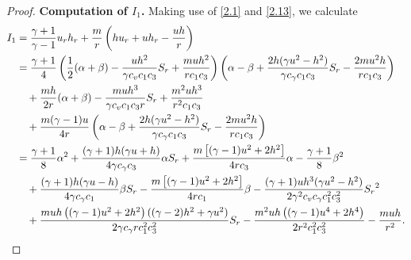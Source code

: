 \documentclass[10pt,a4paper]{amsart}
\begin{document}
\begin{proof}
\noindent\textbf{Computation of $I_1$.}
Making use of \eqref{2.1} and \eqref{2.13}, we calculate
\begin{align}
I_1 &=\frac{\gamma+1}{\gamma-1}u_rh_r+\frac{m}{r}\left(hu_r+uh_r-\frac{uh}{r}\right)\nonumber\\
&=\frac{\gamma+1}{4}\left( \frac12(\alpha+\beta)-\frac{uh^2}{\gamma c_v c_1c_3}S_r +\frac{muh^2}{r c_1 c_3} \right) \left( \alpha-\beta+\frac{2h(\gamma u^2-h^2)}{\gamma c_\gamma c_1c_3}S_r-\frac{2m u^2h}{r c_1 c_3} \right) \nonumber\\
&\quad + \frac{mh}{2r}(\alpha+\beta)-\frac{muh^3}{\gamma c_v c_1c_3 r}S_r + \frac{m^2 u h^3}{r^2 c_1 c_3} \nonumber\\
&\quad+ \frac{m(\gamma-1)u}{4r} \left( \alpha-\beta+\frac{2h(\gamma u^2-h^2)}{\gamma c_\gamma c_1c_3}S_r-\frac{2m u^2h}{r c_1 c_3} \right) \nonumber\\
&=\frac{\gamma + 1}{8}\alpha^2 + \frac{(\gamma + 1)h(\gamma u + h)}{4\gamma c_{\gamma}  c_3}\alpha S_r + \frac{m\left[ (\gamma - 1)u^2 +2 h^2 \right]}{4r c_3}\alpha - \frac{\gamma + 1}{8}\beta^2
    \nonumber\\
&\quad+ \frac{(\gamma + 1)h(\gamma u - h)}{4\gamma c_{\gamma}  c_1}\beta S_r - \frac{m\left[ (\gamma - 1)u^2 +2 h^2 \right]}{4r c_1}\beta - \frac{(\gamma + 1)uh^3(\gamma u^2 - h^2)}{2 \gamma^2 c_v c_{\gamma} c_1^2 c_3^2}{S_r}^2 \nonumber\\
&\quad+ \frac{muh\left( (\gamma - 1)u^2 +2 h^2 \right)((\gamma - 2)h^2 + \gamma u^2)}{2 \gamma c_{\gamma} r c_1^2 c_3^2}S_r -\frac{m^2 uh \left( (\gamma - 1)u^4 + 2h^4 \right)}{2r^2 c_1^2 c_3^2} - \frac{muh}{r^2}. \notag
\end{align}


\end{proof}
\end{document}
